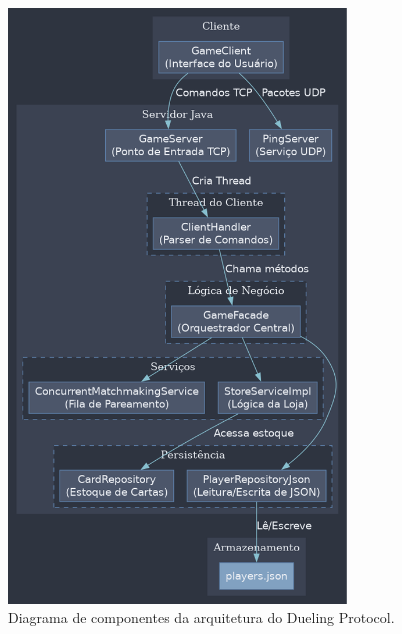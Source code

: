 \documentclass[12pt,a4paper]{article}
\begin{document}
\begin{figure}[h!]
\centering
\includegraphics[width=0.8\textwidth]{figuras/arquitetura.png}
\caption{Diagrama de componentes da arquitetura do Dueling Protocol.}
\label{fig:arquitetura}
\end{figure}
\end{document}
